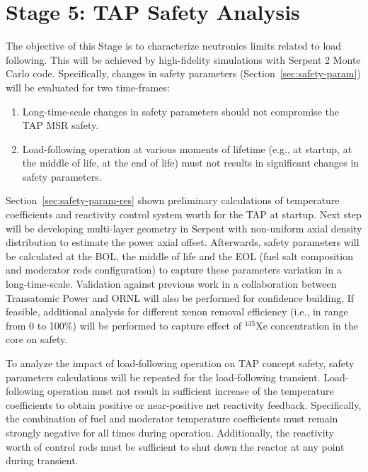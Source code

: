 \section{Stage 5: \gls{TAP} Safety Analysis}
The objective of this Stage is to characterize neutronics limits related to 
load following. This will be achieved by high-fidelity simulations with 
Serpent 2 Monte Carlo code. Specifically, changes in safety parameters 
(Section~\ref{sec:safety-param}) will be evaluated for two time-frames:
\begin{enumerate}
	\item Long-time-scale changes in safety parameters should not compromise 
	the \gls{TAP} \gls{MSR} safety.
	\item Load-following operation at various moments of lifetime (e.g., at
	startup, at the middle of life, at the end of life) must not results in 
	significant changes in safety parameters.
\end{enumerate}
Section~\ref{sec:safety-param-res} shown preliminary calculations of  
temperature coefficients and reactivity control system worth for the \gls{TAP} 
at startup. Next step will be developing multi-layer geometry in Serpent with 
non-uniform axial density distribution to estimate the power axial offset. 
Afterwards, safety parameters will be calculated at the \gls{BOL}, the middle 
of life and the \gls{EOL} (fuel salt composition and moderator rods 
configuration) to capture these parameters variation in a long-time-scale. 
Validation against previous work in a collaboration between Transatomic Power 
and ORNL \cite{betzler_assessment_2017, betzler_fuel_2018} will also be 
performed for confidence building. If feasible, additional analysis for 
different xenon removal efficiency (i.e., in range from 0 to 100\%) will be 
performed to capture effect of $^{135}$Xe concentration in the core on safety.

To analyze the impact of load-following operation on \gls{TAP} concept 
safety, safety parameters calculations will be repeated for the load-following 
transient. Load-following operation must not result in sufficient increase of 
the temperature coefficients to obtain positive or near-positive net 
reactivity feedback. Specifically, the combination of fuel and moderator 
temperature coefficients must remain strongly negative for all times during 
operation. Additionally, the reactivity worth of control rods must be  
sufficient to shut down the reactor at any point during transient.


